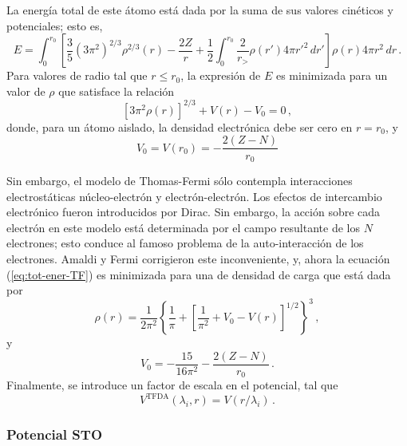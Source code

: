 La energía total de este átomo está dada por la suma de sus valores 
cinéticos y potenciales; esto es,
\begin{equation}
E=\int_0^{r_0}\left[\frac{3}{5}(3\pi^2)^{2/3}\rho^{2/3}(r)-\frac{2Z}{r}
+\frac{1}{2}\int_0^{r_0}\frac{2}{r_>}\rho(r')4\pi r'^2\,dr'\right] 
\rho(r)4\pi r^2\,dr\,.
\label{eq:tot-ener-TF}
\end{equation}
Para valores de radio tal que $r\leq r_0$, la expresión de $E$ es 
minimizada para un valor de $\rho$ que satisface la relación
\begin{equation}
\left[3\pi^2\rho(r)\right]^{2/3}+V(r)-V_0=0\,, 
\end{equation}
donde, para un átomo aislado, la densidad electrónica debe ser cero en
$r=r_0$, y 
\begin{equation}
V_0=V(r_0)=-\frac{2(Z-N)}{r_0}
\end{equation}

Sin embargo, el modelo de Thomas-Fermi sólo contempla interacciones 
electrostáticas núcleo-electrón y electrón-electrón. Los efectos de 
intercambio electrónico fueron introducidos por Dirac. Sin embargo, la 
acción sobre cada electrón en este modelo está determinada por el campo 
resultante de los $N$ electrones; esto conduce al famoso problema de la 
auto-interacción de los electrones. Amaldi y Fermi corrigieron este 
inconveniente, y, ahora la ecuación (\ref{eq:tot-ener-TF}) es minimizada
para una de densidad de carga que está dada por
\begin{equation}
\rho(r)=\frac{1}{2\pi^2}\left\{\frac{1}{\pi}+\left[\frac{1}{\pi^2}+V_0-
V(r)\right]^{1/2}\right\}^3\,,
\end{equation}
y
\begin{equation}
V_0=-\frac{15}{16\pi^2}-\frac{2(Z-N)}{r_0}\,.
\end{equation}
Finalmente, se introduce un factor de escala en el potencial, tal que
\begin{equation*}
 V^{\textrm{TFDA}}(\lambda_i,r) = V(r/\lambda_i)\,.
\label{eq:TFDA-pot}
\end{equation*}

\subsubsection*{Potencial STO}

